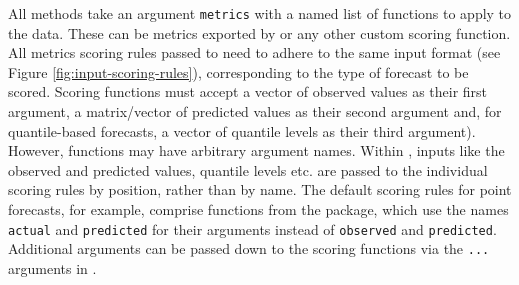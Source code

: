 \documentclass[
]{jss}
\begin{document}
All  methods take an argument \texttt{metrics} with a
named list of functions to apply to the data. These can be metrics
exported by  or any other custom scoring function. All
metrics scoring rules passed to  need to adhere to the
same input format (see Figure \ref{fig:input-scoring-rules}),
corresponding to the type of forecast to be scored. Scoring functions
must accept a vector of observed values as their first argument, a
matrix/vector of predicted values as their second argument and, for
quantile-based forecasts, a vector of quantile levels as their third
argument). However, functions may have arbitrary argument names. Within
, inputs like the observed and predicted values, quantile
levels etc. are passed to the individual scoring rules by position,
rather than by name. The default scoring rules for point forecasts, for
example, comprise functions from the  package, which use
the names \texttt{actual} and \texttt{predicted} for their arguments
instead of \texttt{observed} and \texttt{predicted}. Additional
arguments can be passed down to the scoring functions via the
\texttt{...} arguments in .
\end{document}
